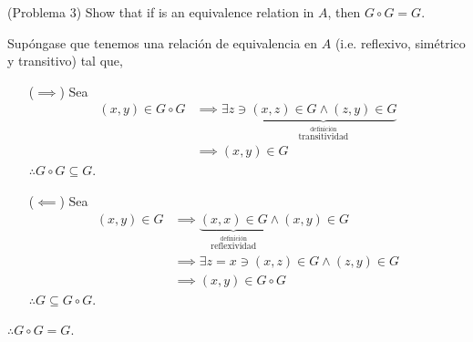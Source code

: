 \begin{problema}(Problema 3)
	Show that if is an equivalence relation in $A$, then $G\circ G=G$.
	\begin{dem}
		Supóngase que tenemos una relación de equivalencia en $A$ (i.e. reflexivo, simétrico y transitivo) tal que, 
		\begin{enumerate}
			\item[($\implies$)] Sea \begin{align*}
				(x,y)\in G\circ G &\implies \exists z\ni \underbrace{(x,z)\in G \wedge (z,y)\in G}_{\stackrel{\text{definición}}{\text{transitividad}}}\\
				&\implies (x,y)\in G
			\end{align*}
		$\therefore G\circ G\subseteq G$. 
			\item[($\impliedby$)] Sea 
			\begin{align*}
				(x,y)\in G &\implies \underbrace{(x,x)\in G} _{\stackrel{\text{definición}}{\text{reflexividad}}} \wedge (x,y)\in G\\
				&\implies \exists z=x\ni (x,z)\in G\wedge (z,y)\in G\\
				&\implies (x,y)\in G\circ G
			\end{align*}
		$\therefore G\subseteq G\circ G$. 
		\end{enumerate}
		$\therefore G\circ G=G$. 
	\end{dem}
\end{problema}
